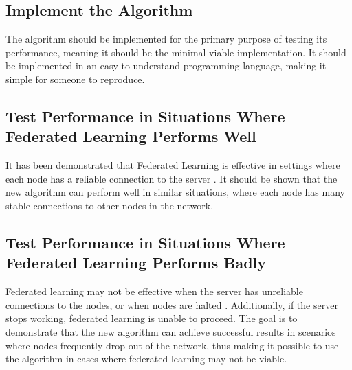 \subsection{Implement the Algorithm}
The algorithm should be implemented for the primary purpose of testing its performance, meaning it should be the minimal viable implementation. It should be implemented in an easy-to-understand programming language, making it simple for someone to reproduce.

\subsection{Test Performance in Situations Where Federated Learning Performs Well}
It has been demonstrated that Federated Learning is effective in settings where each node has a reliable connection to the server \citeme. It should be shown that the new algorithm can perform well in similar situations, where each node has many stable connections to other nodes in the network.

\subsection{Test Performance in Situations Where Federated Learning Performs Badly}
Federated learning may not be effective when the server has unreliable connections to the nodes, or when nodes are halted \citeme. Additionally, if the server stops working, federated learning is unable to proceed. The goal is to demonstrate that the new algorithm can achieve successful results in scenarios where nodes frequently drop out of the network, thus making it possible to use the algorithm in cases where federated learning may not be viable.